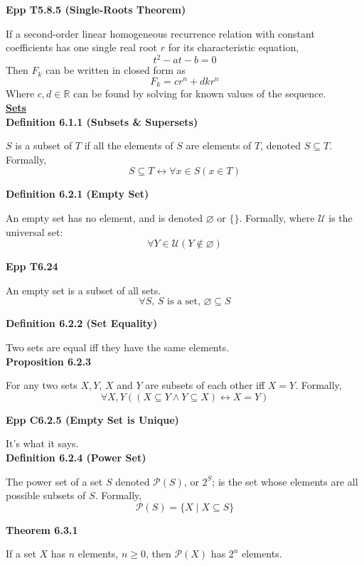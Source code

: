 \documentclass[a4paper]{article}
\newcommand{\heading}[1]{{\small\underline{\textbf{#1}}}}
\newcommand{\subheading}[1]{{\scriptsize\textbf{#1}}}
\begin{document}
\begin{multicols*}{4}
\subheading{Epp T5.8.5 (Single-Roots Theorem)}

If a second-order linear homogeneous recurrence relation with constant
coefficients has one single real root $r$ for its characteristic equation,
$$t^2 - at - b = 0$$
Then $F_k$ can be written in closed form as
$$F_k = cr^n + dkr^n$$
Where $c, d \in \mathbb{R}$ can be found by solving for known values of the
sequence.\\

\heading{Sets} \\

\subheading{Definition 6.1.1 (Subsets \& Supersets)}

$S$ is a subset of $T$ if all the elements of $S$ are elements of $T$, denoted
$S \subseteq T$. Formally, $$S \subseteq T \longleftrightarrow \forall x \in S
(x \in T)$$

\subheading{Definition 6.2.1 (Empty Set)}

An empty set has no element, and is denoted $\varnothing$ or $\{\}$. Formally,
where $\mathcal{U}$ is the universal set: $$\forall Y \in \mathcal{U} (Y \not\in
\varnothing)$$

\subheading{Epp T6.24}

An empty set is a subset of all sets.
$$\forall S\text{, $S$ is a set, }\varnothing \subseteq S$$

\subheading{Definition 6.2.2 (Set Equality)}

Two sets are equal iff they have the same elements.\\

\subheading{Proposition 6.2.3}

For any two sets $X, Y$, $X$ and $Y$ are subsets of each other iff $X = Y$.
Formally,
$$\forall X, Y((X \subseteq Y \land Y \subseteq X) \longleftrightarrow X=Y)$$

\subheading{Epp C6.2.5 (Empty Set is Unique)}

It's what it says.\\

\subheading{Definition 6.2.4 (Power Set)}

The power set of a set $S$ denoted $\mathcal{P}(S)$, or $2^S$; is the set whose
elements are all possible subsets of $S$. Formally,
$$\mathcal{P}(S) = \{X\;|\;X\subseteq S\}$$

\subheading{Theorem 6.3.1}

If a set $X$ has $n$ elements, $n \geq 0$, then $\mathcal{P}(X)$ has $2^n$
elements. \\


\end{multicols*}
\end{document}
